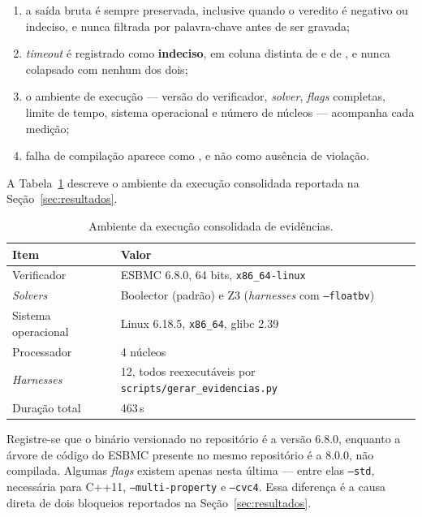 \begin{enumerate}[leftmargin=1.4cm]
  \item a saída bruta é sempre preservada, inclusive quando o veredito é negativo ou
  indeciso, e nunca filtrada por palavra-chave antes de ser gravada;
  \item \textit{timeout} é registrado como \textbf{indeciso}, em coluna distinta de
   e de , e nunca colapsado com nenhum dos dois;
  \item o ambiente de execução --- versão do verificador, \textit{solver}, \textit{flags}
  completas, limite de tempo, sistema operacional e número de núcleos --- acompanha cada
  medição;
  \item falha de compilação aparece como , e não como ausência de
  violação.
\end{enumerate}

A Tabela~\ref{tab:ambiente} descreve o ambiente da execução consolidada reportada na
Seção~\ref{sec:resultados}.

\begin{table}[H]
\centering
\caption{Ambiente da execução consolidada de evidências.}
\label{tab:ambiente}
\small
\begin{tabular}{@{}ll@{}}
\toprule
\textbf{Item} & \textbf{Valor} \\
\midrule
Verificador            & ESBMC 6.8.0, 64 bits, \texttt{x86\_64-linux} \\
\textit{Solvers}       & Boolector (padrão) e Z3 (\textit{harnesses} com \texttt{--floatbv}) \\
Sistema operacional    & Linux 6.18.5, \texttt{x86\_64}, glibc 2.39 \\
Processador            & 4 núcleos \\
\textit{Harnesses}     & 12, todos reexecutáveis por \texttt{scripts/gerar\_evidencias.py} \\
Duração total          & 463\,s \\
\bottomrule
\end{tabular}
\end{table}

Registre-se que o binário versionado no repositório é a versão 6.8.0, enquanto a árvore de
código do ESBMC presente no mesmo repositório é a 8.0.0, não compilada. Algumas
\textit{flags} existem apenas nesta última --- entre elas \texttt{--std}, necessária para
C++11, \texttt{--multi-property} e \texttt{--cvc4}. Essa diferença é a causa direta de dois
bloqueios reportados na Seção~\ref{sec:resultados}.

